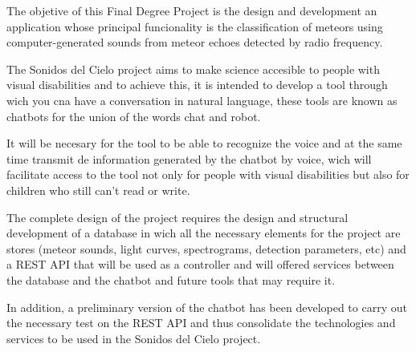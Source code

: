 The objetive of this Final Degree Project is the design and development an application whose principal funcionality is the classification of meteors using computer-generated sounds from meteor echoes detected by radio frequency.

The Sonidos del Cielo project aims to make science accesible to people with visual disabilities and to achieve this, it is intended to develop a tool through wich you cna have a conversation in natural language, these tools are known as chatbots for the union of the words chat and robot.

It will be necesary for the tool to be able to recognize the voice and at the same time transmit de information generated by the chatbot by voice, wich will facilitate access to the tool not only for people with visual disabilities but also for children who still can't read or write.

The complete design of the project requires the design and structural development of a database in wich all the necessary elements for the project are stores (meteor sounds, light curves, spectrograms, detection parameters, etc) and a REST API that will be used as a controller and will offered services between the database and the chatbot and future tools that may require it.

In addition, a preliminary version of the chatbot has been developed to carry out the necessary test on the REST API and thus consolidate the technologies and services to be used in the Sonidos del Cielo project.


